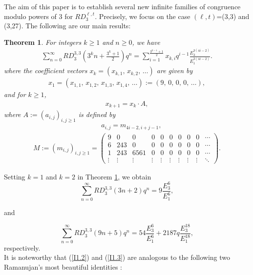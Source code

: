 \documentclass[11pt,a4paper]{article}
\numberwithin{equation}{section}
\theoremstyle{plain}
\newtheorem{theorem}{Theorem}[section]
\begin{document}
The  aim of this paper is to establish several new infinite families of congruence modulo  powers of 3 for $RD_3^{\ell,t}$. Precisely, we focus on the case $(\ell,t)$=(3,3) and (3,27).
 The following are our main results:
	\begin{theorem}\label{T1}
		For integers $k \geq 1$ and $n \geq 0$, we have
		\begin{align*}
			\sum_{n=0}^{\infty}RD_3^{3,3}\left(3^kn+\frac{3^k+1}{2}\right)q^n=\sum_{i=1}^{\frac{3^{k-1}+1}{2}}x_{k,i}q^{i-1}\frac{E_3^{3(4i-2)}}{E_1^{3(4i-2)}}.
		\end{align*}
		where the coefficient vectors
		$	x_{k}=(x_{k,1},\,x_{k,2},\,\ldots)$ are given by
		\begin{align}
			x_1 =(x_{1,1},\,x_{1,2},\,x_{1,3},\,x_{1,4},\,\ldots)
			:= (9,\,0,\,0,\,0,\,\ldots),
			\label{x1}
		\end{align}
		and for $k\geq1$,	
	\begin{align*}
			x_{k+1}=x_k\cdot A,
	\end{align*}
		where 
		$	A:=(a_{i,j})_{i,j\geq1}$ is defined by
	\begin{align}
			\,\,\,\,\,\,\,\,a_{i,j}=m_{4i-2,i+j-1},\label{A}
				\end{align}
				\begin{align*}
					M:=(m_{i,j})_{i,j\ge1}=
	\left(
	\begin{array}{cccccccccc}
		9 & 0 & 0 & 0 & 0 & 0 & 0 & 0 & 0 & \cdots\\
		6 & 243 & 0 & 0 & 0 & 0 & 0 & 0 & 0 & \cdots\\
		1 & 243 & 6561 & 0 & 0 & 0 & 0 & 0 & 0 & \cdots\\
		\vdots & \vdots & \vdots & \vdots & \vdots & \vdots &
		\vdots & \vdots & \vdots & \ddots
	\end{array}
	\right).
		\end{align*}
		\end{theorem}
	Setting $k=1$ and $k=2$ in Theorem \ref{T1}, we obtain
	\begin{equation}\label{I1.2}
	\sum_{n=0}^{\infty}RD_3^{3,3}\left(3n+2\right)q^n=9\frac{E_3^{6}}{E_1^{6}},
	\end{equation}
	
	and
	
	\begin{equation}\label{I1.3}
			\sum_{n=0}^{\infty}RD_3^{3,3}\left(9n+5\right)q^n=
		54\frac{E_3^6}{E_1^6}
		+2187q\frac{E_3^{18}}{E_1^{18}},
		\end{equation}
	respectively.\\
	It is noteworthy that (\ref*{I1.2}) and (\ref*{I1.3}) are analogous to the following two Ramanujan's most beautiful identities \cite[p.~239, p.~243]{Ramanujan}:
	
\end{document}
